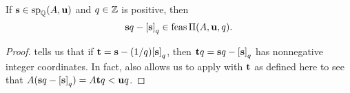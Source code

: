 \documentclass[11pt]{amsart}
\begin{document}
%
%
%





\begin{theorem}
\label{canonical-feasible: T}
If $\mathbf{s} \in \operatorname{sp}_{\mathbb{Q}}(A, \mathbf{u})$ and $q \in \mathbb{Z}$ is positive, then  \[ \mathbf{s}q - \left[ \mathbf{s} \right]_q \in \operatorname{feas} \Pi(A, \mathbf{u}, q).\] 
\end{theorem}

\begin{proof}   tells us that if $\mathbf{t} = \mathbf{s} - (1/q) {\left[ \mathbf{s} \right]_q}$, then $\mathbf{t}q = \mathbf{s}q -\left[ \mathbf{s} \right]_q$ has nonnegative integer coordinates.  In fact,  also allows us to apply  with $\mathbf{t}$ as defined here to see that $A (\mathbf{s} q - \left[ \mathbf{s} \right]_q ) =  A\mathbf{t}q <  \mathbf{u}q$.  
\end{proof}

\end{document}
